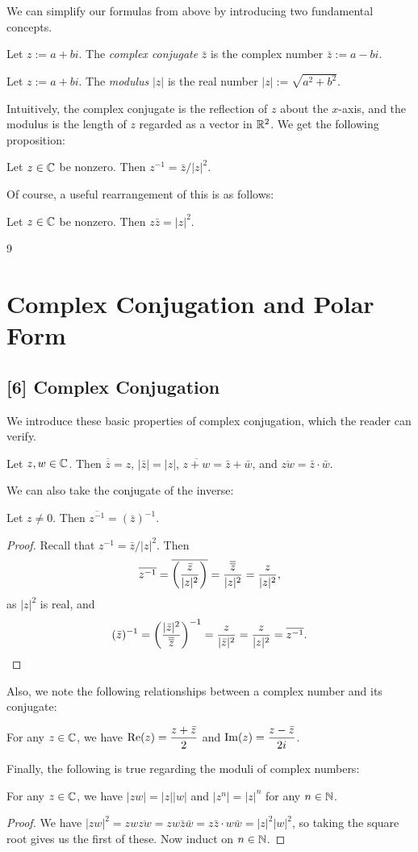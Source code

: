 \documentclass{article}
\begin{document}
We can simplify our formulas from above by introducing two fundamental concepts.
\begin{definition}
Let $z := a+bi$. The \textit{complex conjugate} $\bar z$ is the complex number $\bar z:= a-bi$.
\end{definition}
\begin{definition}
Let $z:=a+bi$. The \textit{modulus} $|z|$ is the real number $|z| := \sqrt{a^2+b^2}$.
\end{definition}
Intuitively, the complex conjugate is the reflection of $z$ about the $x$-axis, and the modulus is the length of $z$ regarded as a vector in $\mathbb R^2$. We get the following proposition:
\begin{proposition}
Let $z\in\mathbb C$ be nonzero. Then $z^{-1} = \bar z/|z|^2$.
\end{proposition}
Of course, a useful rearrangement of this is as follows:
\begin{corollary}
Let $z\in\mathbb C$ be nonzero. Then $z\bar z = |z|^2$.
\end{corollary}
\setcounter{section}9
\section{Complex Conjugation and Polar Form}
\subsection*{[6] Complex Conjugation}
We introduce these basic properties of complex conjugation, which the reader can verify.
\begin{proposition}
Let $z,w\in \mathbb C$. Then $\overline{\overline z} = z$, $|\bar z| = |z|$, $\overline{z+w} = \bar z + \bar w$, and $\overline{zw} = \bar z\cdot \bar w$.
\end{proposition}
We can also take the conjugate of the inverse:
\begin{proposition}
Let $z\neq 0$. Then $\overline{z^{-1}} = (\bar z)^{-1}$.
\end{proposition}
\begin{proof}
Recall that $z^{-1} = \bar z/|z|^2$. Then
$$\overline{z^{-1}} = \overline{\left(\frac{\bar z}{|z|^2} \right)} = \frac{\overline{\overline z}}{|z|^2} = \frac z{|z|^2},$$
as $|z|^2$ is real, and 
$$(\bar z)^{-1} = \left(\frac{|\bar z|^2}{\overline{\overline z}} \right)^{-1} = \frac z{|\bar z|^2} = \frac z{|z|^2} = \overline{z^{-1}}.$$
\end{proof}
Also, we note the following relationships between a complex number and its conjugate:
\begin{proposition}
For any $z\in \mathbb C$, we have $\displaystyle \operatorname{Re}(z) = \frac{z+\bar z}2$ and $\operatorname{Im}(z) = \displaystyle\frac{z-\bar z}{2i}$.
\end{proposition}
Finally, the following is true regarding the moduli of complex numbers:
\begin{proposition}
For any $z\in\mathbb C$, we have $|zw| = |z||w|$ and $|z^n| = |z|^n$ for any $n\in\mathbb N$.
\end{proposition}
\begin{proof}
We have $|zw|^2 = zw\overline{zw} = zw\bar z\bar w = z\bar z\cdot w\bar w = |z|^2|w|^2$, so taking the square root gives us the first of these. Now induct on $n\in\mathbb N$.
\end{proof}
\end{document}
